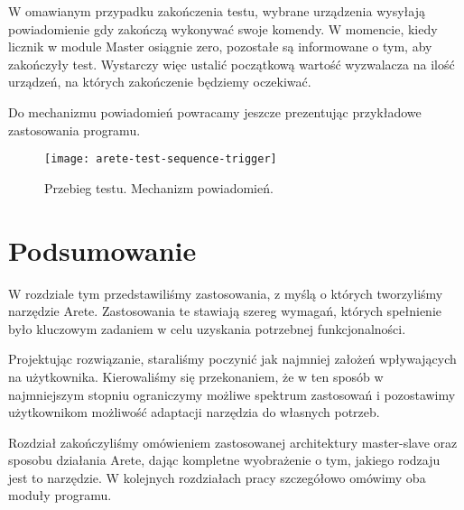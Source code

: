 \documentclass[00-praca-magisterska.tex]{subfiles}
\begin{document}
W omawianym przypadku zakończenia testu, wybrane urządzenia wysyłają
powiadomienie gdy zakończą wykonywać swoje komendy. W momencie, kiedy licznik w
module Master osiągnie zero, pozostałe są informowane o tym, aby zakończyły
test. Wystarczy więc ustalić początkową wartość wyzwalacza na ilość urządzeń,
na których zakończenie będziemy oczekiwać.

Do mechanizmu powiadomień powracamy jeszcze prezentując przykładowe
zastosowania programu.

\begin{figure}
\begin{center}
\leavevmode
\texttt{[image: arete-test-sequence-trigger]}
\end{center}
\caption{Przebieg testu. Mechanizm powiadomień.}
\label{fig:arete-test-seq-trigger}
\end{figure}

\section{Podsumowanie}

W rozdziale tym przedstawiliśmy zastosowania, z myślą o których tworzyliśmy
narzędzie Arete. Zastosowania te stawiają szereg wymagań, których spełnienie
było kluczowym zadaniem w celu uzyskania potrzebnej funkcjonalności.

Projektując rozwiązanie, staraliśmy poczynić jak najmniej założeń
wpływających na użytkownika. Kierowaliśmy się przekonaniem, że w ten sposób w
najmniejszym stopniu ograniczymy możliwe spektrum zastosowań i pozostawimy
użytkownikom możliwość adaptacji narzędzia do własnych potrzeb.

Rozdział zakończyliśmy omówieniem zastosowanej architektury master-slave oraz
sposobu działania Arete, dając kompletne wyobrażenie o tym, jakiego rodzaju
jest to narzędzie. W kolejnych rozdziałach pracy szczegółowo omówimy oba moduły
programu.
\end{document}
